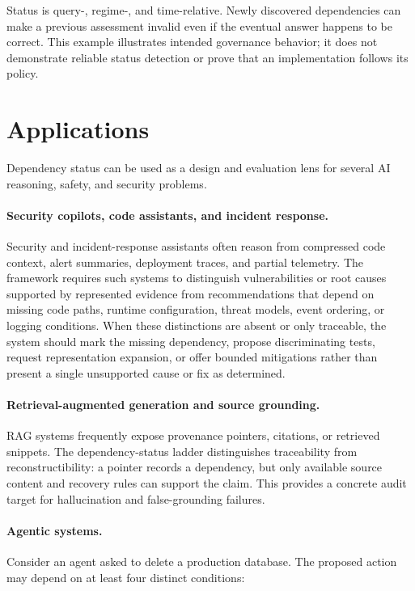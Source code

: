 \documentclass[11pt]{article}
\theoremstyle{definition}
\theoremstyle{remark}
\begin{document}
Status is query-, regime-, and time-relative. Newly discovered dependencies can make a previous assessment invalid even if the eventual answer happens to be correct. This example illustrates intended governance behavior; it does not demonstrate reliable status detection or prove that an implementation follows its policy.
\section{Applications}

Dependency status can be used as a design and evaluation lens for several AI reasoning, safety, and security problems.

\paragraph{Security copilots, code assistants, and incident response.}
Security and incident-response assistants often reason from compressed code context, alert summaries, deployment traces, and partial telemetry. The framework requires such systems to distinguish vulnerabilities or root causes supported by represented evidence from recommendations that depend on missing code paths, runtime configuration, threat models, event ordering, or logging conditions. When these distinctions are absent or only traceable, the system should mark the missing dependency, propose discriminating tests, request representation expansion, or offer bounded mitigations rather than present a single unsupported cause or fix as determined.

\paragraph{Retrieval-augmented generation and source grounding.}
RAG systems frequently expose provenance pointers, citations, or retrieved snippets. The dependency-status ladder distinguishes traceability from reconstructibility: a pointer records a dependency, but only available source content and recovery rules can support the claim. This provides a concrete audit target for hallucination and false-grounding failures.

\paragraph{Agentic systems.}
Consider an agent asked to delete a production database. The proposed action may depend on at least four distinct conditions:
\end{document}
